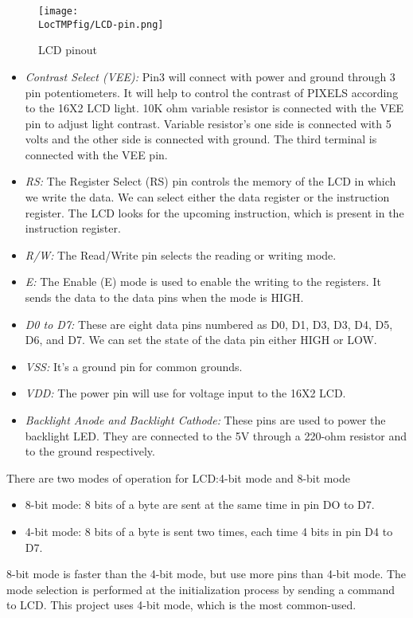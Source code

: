 \begin{figure}
  \centering
  \texttt{[image: \\LocTMPfig/LCD-pin.png]}
  \caption{LCD pinout}
  \label{fig:LCDpinout}
\end{figure}

\begin{itemize}
\item\textit{Contrast Select (VEE): }Pin3 will connect with
power and ground through 3 pin potentiometers. It will help to
control the contrast of PIXELS according to the 16X2 LCD light.
10K
ohm variable resistor is connected with the VEE pin to adjust
light contrast. Variable resistor's one side is connected with 5
volts and the other side is connected with ground. The third
terminal is connected with the VEE pin.
\item\textit{RS: }The Register Select (RS) pin controls the
memory of the LCD in which we write the data. We can select
either the data register or the instruction register. The LCD
looks for
the upcoming instruction, which is present in the instruction
register.
\item\textit{R/W: }The Read/Write pin selects the reading or
writing mode.
\item\textit{E: }The Enable (E) mode is used to enable the
writing to the registers. It sends the data to the data pins
when the mode is HIGH.
\item\textit{D0 to D7: }These are eight data pins numbered as
D0, D1, D3, D3, D4, D5, D6, and D7. We can set the state of the
data pin either HIGH or LOW.
\item\textit{VSS: }It’s a ground pin for common grounds.
\item\textit{VDD: }The power pin will use for voltage input to
the 16X2 LCD.
\item\textit{Backlight Anode and Backlight Cathode: }These pins
are used to power the backlight LED. They are connected to the
5V through a 220-ohm resistor and to the ground respectively.
\end{itemize}

There are two modes of operation for LCD:4-bit mode and 8-bit
mode
\begin{itemize}
\item 8-bit mode: 8 bits of a byte are sent at the same time in
pin DO to D7.
\item 4-bit mode: 8 bits of a byte is sent two times, each time
4 bits in pin D4 to D7.
\end{itemize}
8-bit mode is faster than the 4-bit mode, but use more pins than
4-bit mode. The mode selection is performed at the
initialization process by sending a command to LCD.
This project uses 4-bit mode, which is the most common-used.

